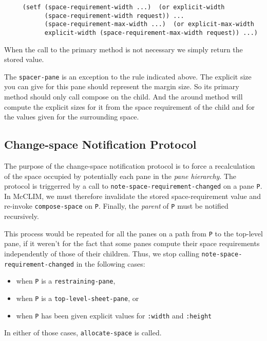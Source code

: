 \begin{verbatim}
     (setf (space-requirement-width ...)  (or explicit-width
           (space-requirement-width request)) ...
           (space-requirement-max-width ...)  (or explicit-max-width
           explicit-width (space-requirement-max-width request)) ...)
\end{verbatim}

When the call to the primary method is not necessary we simply return
the stored value.

The \texttt{spacer-pane} is an exception to the rule indicated above.  The
explicit size you can give for this pane should represent the margin
size.  So its primary method should only call compose on the child.  And
the around method will compute the explicit sizes for it from the space
requirement of the child and for the values given for the surrounding
space.

\subsection{Change-space Notification Protocol}

The purpose of the change-space notification protocol is to force a
recalculation of the space occupied by potentially each pane in the
\emph{pane hierarchy}.  The protocol is triggerred by a call to
\texttt{note-space-requirement-changed} on a pane \texttt{P}. In McCLIM, we
must therefore invalidate the stored space-requirement value and
re-invoke \texttt{compose-space} on \texttt{P}.  Finally, the
\emph{parent} of \texttt{P} must be notified recursively.

This process would be repeated for all the panes on a path from \texttt{P}
to the top-level pane, if it weren't for the fact that some panes
compute their space requirements independently of those of their
children.  Thus, we stop calling \texttt{note-space-requirement-changed}
in the following cases:

\begin{itemize}
\item
 when \texttt{P} is a \texttt{restraining-pane},
\item
 when \texttt{P} is a \texttt{top-level-sheet-pane}, or
\item
 when \texttt{P} has been given explicit values for \texttt{:width} and
  \texttt{:height}
\end{itemize}

In either of those cases, \texttt{allocate-space} is called.
